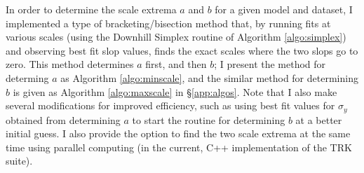 In order to determine the scale extrema $a$ and $b$ for a given model and dataset, I implemented a type of bracketing/bisection method that, by running fits at various scales (using the Downhill Simplex routine of Algorithm \ref{algo:simplex}) and observing best fit slop values, finds the exact scales where the two slops go to zero. This method determines $a$ first, and then $b$; I present the method for determing $a$ as Algorithm \ref{algo:minscale}, and the similar method for determining $b$ is given as Algorithm \ref{algo:maxscale} in \S\ref{app:algos}. Note that I also make several modifications for improved efficiency, such as using best fit values for $\sigma_y$ obtained from determining $a$ to start the routine for determining $b$ at a better initial guess. I also provide the option to find the two scale extrema at the same time using parallel computing (in the current, C++ implementation of the TRK suite).
